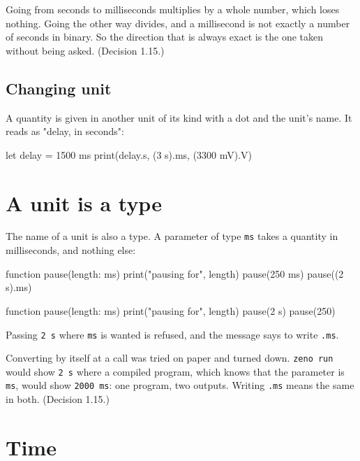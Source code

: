\begin{why}
Going from seconds to milliseconds multiplies by a whole number, which
loses nothing. Going the other way divides, and a millisecond is not
exactly a number of seconds in binary. So the direction that is always
exact is the one taken without being asked. (Decision 1.15.)
\end{why}

\subsection{Changing unit}

A quantity is given in another unit of its kind with a dot and the
unit's name. It reads as "delay, in seconds":

\begin{zeno}
let delay = 1500 ms
print(delay.s, (3 s).ms, (3300 mV).V)
\end{zeno}

\section{A unit is a type}

The name of a unit is also a type. A parameter of type \verb|ms|
takes a quantity in milliseconds, and nothing else:

\begin{zeno}
function pause(length: ms) {
    print("pausing for", length)
}
pause(250 ms)
pause((2 s).ms)
\end{zeno}

\begin{zeno}[fails=yes]
function pause(length: ms) {
    print("pausing for", length)
}
pause(2 s)
pause(250)
\end{zeno}

Passing \verb|2 s| where \verb|ms| is wanted is refused, and the
message says to write \verb|.ms|.

\begin{why}
Converting by itself at a call was tried on paper and turned down.
\verb|zeno run| would show \verb|2 s| where a compiled program, which
knows that the parameter is \verb|ms|, would show \verb|2000 ms|: one
program, two outputs. Writing \verb|.ms| means the same in both.
(Decision 1.15.)
\end{why}

\section{Time}

